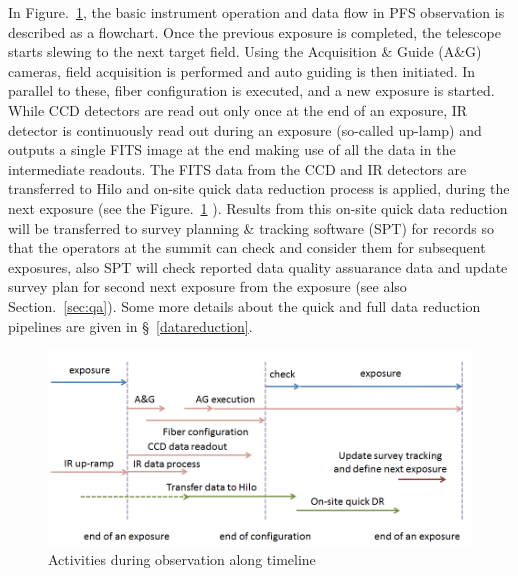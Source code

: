 \documentclass[a4paper,notitlepage]{article}
\begin{document}
In Figure.~\ref{fig:sciops-scireq-slide-oneexp}, the basic instrument
operation and data flow in PFS observation is described as a
flowchart. Once the previous exposure is completed, the telescope starts
slewing to the next target field. Using the Acquisition \& Guide (A\&G)
cameras, field acquisition is performed and auto guiding is then
initiated. In parallel to these, fiber configuration is executed, and a
new exposure is started. While CCD detectors are read out only once at
the end of an exposure, IR detector is continuously read out during an
exposure (so-called up-lamp) and outputs a single FITS image at the end
making use of all the data in the intermediate readouts. The FITS data
from the CCD and IR detectors are transferred to Hilo and on-site quick
data reduction process is applied, during the next exposure (see the
Figure.~\ref{fig:sciops-scireq-slide-oneexp}
). Results from this on-site quick data reduction will be transferred to
survey planning \& tracking software (SPT) for records so that the operators
at the summit can check and consider them for subsequent exposures, 
also SPT will check reported data quality assuarance data and update survey 
plan for second next exposure from the exposure 
(see also Section.~\ref{sec:qa}). 
Some
more details about the quick and full data reduction pipelines are given
in \S~\ref{datareduction}.

\begin{figure}[htb]
  \begin{center}
    \includegraphics[width=.75\linewidth]{sciops-scireq-slide-oneexp.png}
  \end{center}
  \caption{Activities during observation along timeline}
  \label{fig:sciops-scireq-slide-oneexp}
\end{figure}

%
\end{document}
